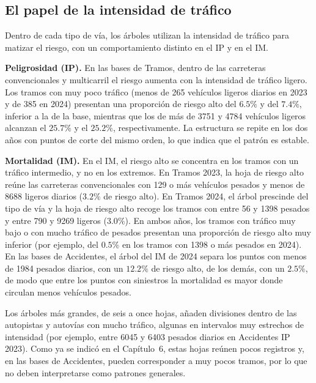 \documentclass[twoside,a4paper,12pt,onecolumn,openany]{book}
\begin{document}
\subsection{El papel de la intensidad de tráfico}
 
Dentro de cada tipo de vía, los árboles utilizan la intensidad de tráfico para matizar el riesgo, con un comportamiento distinto en el IP y en el IM.
 
\vspace{0.5cm}
 
\textbf{Peligrosidad (IP).} En las bases de Tramos, dentro de las carreteras convencionales y multicarril el riesgo aumenta con la intensidad de tráfico ligero. Los tramos con muy poco tráfico (menos de 265 vehículos ligeros diarios en 2023 y de 385 en 2024) presentan una proporción de riesgo alto del $6.5\%$ y del $7.4\%$, inferior a la de la base, mientras que los de más de 3751 y 4784 vehículos ligeros alcanzan el $25.7\%$ y el $25.2\%$, respectivamente. La estructura se repite en los dos años con puntos de corte del mismo orden, lo que indica que el patrón es estable.
 
\vspace{0.5cm}
 
\textbf{Mortalidad (IM).} En el IM, el riesgo alto se concentra en los tramos con un tráfico intermedio, y no en los extremos. En Tramos 2023, la hoja de riesgo alto reúne las carreteras convencionales con 129 o más vehículos pesados y menos de 8688 ligeros diarios ($3.2\%$ de riesgo alto). En Tramos 2024, el árbol prescinde del tipo de vía y la hoja de riesgo alto recoge los tramos con entre 56 y 1398 pesados y entre 790 y 9269 ligeros ($3.0\%$). En ambos años, los tramos con tráfico muy bajo o con mucho tráfico de pesados presentan una proporción de riesgo alto muy inferior (por ejemplo, del $0.5\%$ en los tramos con 1398 o más pesados en 2024). En las bases de Accidentes, el árbol del IM de 2024 separa los puntos con menos de 1984 pesados diarios, con un $12.2\%$ de riesgo alto, de los demás, con un $2.5\%$, de modo que entre los puntos con siniestros la mortalidad es mayor donde circulan menos vehículos pesados.
 
\vspace{0.5cm}
 
Los árboles más grandes, de seis a once hojas, añaden divisiones dentro de las autopistas y autovías con mucho tráfico, algunas en intervalos muy estrechos de intensidad (por ejemplo, entre 6045 y 6403 pesados diarios en Accidentes IP 2023). Como ya se indicó en el Capítulo~6, estas hojas reúnen pocos registros y, en las bases de Accidentes, pueden corresponder a muy pocos tramos, por lo que no deben interpretarse como patrones generales.
 
\end{document}
